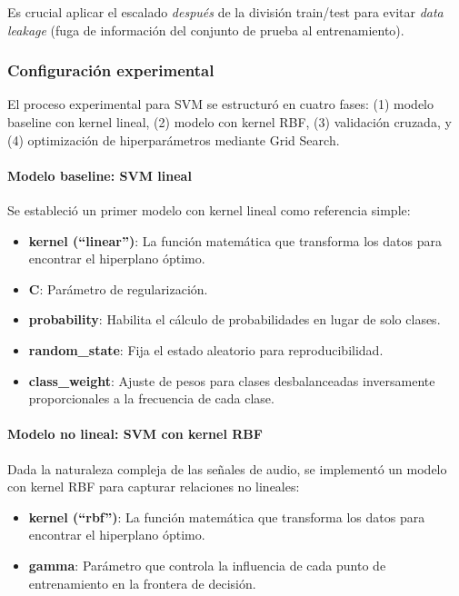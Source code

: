Es crucial aplicar el escalado \textit{después} de la división train/test para evitar \textit{data leakage} (fuga de información del conjunto de prueba al entrenamiento).

\subsubsection*{Configuración experimental}

El proceso experimental para SVM se estructuró en cuatro fases: (1) modelo baseline con kernel lineal, (2) modelo con kernel RBF, (3) validación cruzada, y (4) optimización de hiperparámetros mediante Grid Search.

\paragraph{Modelo baseline: SVM lineal}
Se estableció un primer modelo con kernel lineal como referencia simple:

\begin{itemize}
	\item \textbf{kernel (``linear'')}: La función matemática que transforma los datos para encontrar el hiperplano óptimo.
	\item \textbf{C}: Parámetro de regularización.
	\item \textbf{probability}: Habilita el cálculo de probabilidades en lugar de solo clases.
	\item \textbf{random_state}: Fija el estado aleatorio para reproducibilidad.
	\item \textbf{class_weight}: Ajuste de pesos para clases desbalanceadas inversamente proporcionales a la frecuencia de cada clase.
\end{itemize}

\paragraph{Modelo no lineal: SVM con kernel RBF}
Dada la naturaleza compleja de las señales de audio, se implementó un modelo con kernel RBF para capturar relaciones no lineales:

\begin{itemize}
	\item \textbf{kernel (``rbf'')}: La función matemática que transforma los datos para encontrar el hiperplano óptimo.
	\item \textbf{gamma}: Parámetro que controla la influencia de cada punto de entrenamiento en la frontera de decisión.
\end{itemize}

